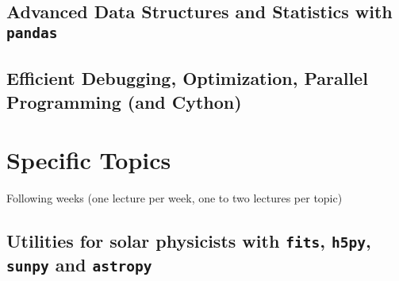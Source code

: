 \documentclass[10pt,a4paper]{article}
\begin{document}
		\subsection{Advanced Data Structures and Statistics with \texttt{pandas}}
		\subsection{Efficient Debugging, Optimization, Parallel Programming (and Cython)}
	
	\vspace{1cm}
	\section{Specific Topics}
	Following weeks (one lecture per week, one to two lectures per topic)
		
		\subsection{Utilities for solar physicists with \texttt{fits}, \texttt{h5py}, \texttt{sunpy} and \texttt{astropy}}
		
	\thispagestyle{empty}
\end{document}
